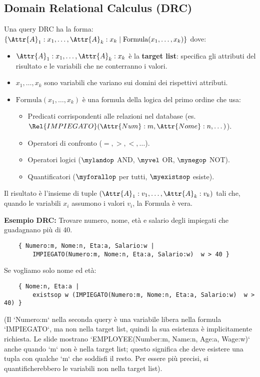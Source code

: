 \subsection{Domain Relational Calculus (DRC)}
Una query DRC ha la forma:
$\{ \Attr{A}_1:x_1, \dots, \Attr{A}_k:x_k \mid \text{Formula}(x_1, \dots, x_k) \}$
dove:
\begin{itemize}
	\item $\Attr{A}_1:x_1, \dots, \Attr{A}_k:x_k$ è la \textbf{target list}: specifica gli attributi del risultato e le variabili che ne conterranno i valori.
	\item $x_1, \dots, x_k$ sono variabili che variano sui domini dei rispettivi attributi.
	\item $\text{Formula}(x_1, \dots, x_k)$ è una formula della logica del primo ordine che usa:
	\begin{itemize}
		\item Predicati corrispondenti alle relazioni nel database (es. $\Rel{IMPIEGATO}(\Attr{Num}:m, \Attr{Nome}:n, \dots)$).
		\item Operatori di confronto ($=, >, <, \dots$).
		\item Operatori logici ($\mylandop$ AND, $\myvel$ OR, $\mynegop$ NOT).
		\item Quantificatori ($\myforallop$ per tutti, $\myexistsop$ esiste).
	\end{itemize}
\end{itemize}
Il risultato è l'insieme di tuple $(\Attr{A}_1:v_1, \dots, \Attr{A}_k:v_k)$ tali che, quando le variabili $x_i$ assumono i valori $v_i$, la Formula è vera.

\textbf{Esempio DRC:} Trovare numero, nome, età e salario degli impiegati che guadagnano più di 40.
\begin{verbatim}
	{ Numero:m, Nome:n, Eta:a, Salario:w |
		IMPIEGATO(Numero:m, Nome:n, Eta:a, Salario:w)  w > 40 }
\end{verbatim}
Se vogliamo solo nome ed età:
\begin{verbatim}
	{ Nome:n, Eta:a |
		existsop w (IMPIEGATO(Numero:m, Nome:n, Eta:a, Salario:w)  w > 40) }
\end{verbatim}
(Il `Numero:m` nella seconda query è una variabile libera nella formula `IMPIEGATO`, ma non nella target list, quindi la sua esistenza è implicitamente richiesta. Le slide mostrano `EMPLOYEE(Number:m, Name:n, Age:a, Wage:w)` anche quando `m` non è nella target list; questo significa che deve esistere una tupla con qualche `m` che soddisfi il resto. Per essere più precisi, si quantificherebbero le variabili non nella target list).


